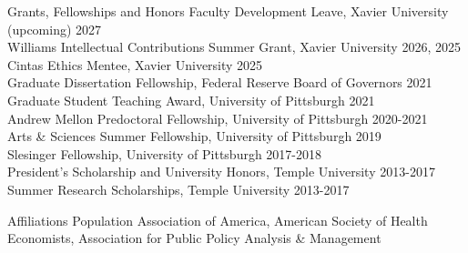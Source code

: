 \documentclass{resume} %
\begin{document}
\begin{rSection}{Grants, Fellowships and Honors}
	Faculty Development Leave, Xavier University (upcoming) \hfill {2027} \\
	Williams Intellectual Contributions Summer Grant, Xavier University \hfill {2026, 2025} \\
	Cintas Ethics Mentee, Xavier University \hfill {2025}\\
	Graduate Dissertation Fellowship, Federal Reserve Board of Governors \hfill {2021} \\
	Graduate Student Teaching Award, University of Pittsburgh \hfill {2021} \\
	Andrew Mellon Predoctoral Fellowship, University of Pittsburgh \hfill {2020-2021} \\
	Arts \& Sciences Summer Fellowship, University of Pittsburgh \hfill {2019} \\
	Slesinger Fellowship, University of Pittsburgh \hfill {2017-2018} \\
	President's Scholarship and University Honors, Temple University \hfill {2013-2017}\\
	Summer Research Scholarships, Temple University \hfill {2013-2017}
\end{rSection}

\begin{rSection}{Affiliations}
Population Association of America, American Society of Health Economists, Association for Public Policy Analysis \& Management
\end{rSection}
\end{document}
